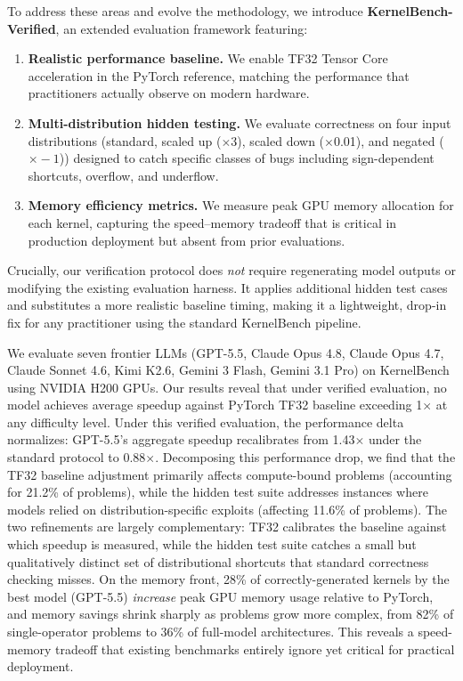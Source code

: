 \documentclass[]{fairmeta}
\begin{document}
To address these areas and evolve the methodology, we introduce \textbf{KernelBench-Verified}, an extended evaluation framework featuring:
\begin{enumerate}[nosep]
\item \textbf{Realistic performance baseline.} We enable TF32 Tensor Core acceleration in the PyTorch reference, matching the performance that practitioners actually observe on modern hardware.
\item \textbf{Multi-distribution hidden testing.} We evaluate correctness on four input distributions (standard, scaled up ($\times$3), scaled down ($\times$0.01), and negated ($\times{-}1$)) designed to catch specific classes of bugs including sign-dependent shortcuts, overflow, and underflow.
\item \textbf{Memory efficiency metrics.} We measure peak GPU memory allocation for each kernel, capturing the speed--memory tradeoff that is critical in production deployment but absent from prior evaluations.
\end{enumerate}

Crucially, our verification protocol does \emph{not} require regenerating model outputs or modifying the existing evaluation harness. It applies additional hidden test cases and substitutes a more realistic baseline timing, making it a lightweight, drop-in fix for any practitioner using the standard KernelBench pipeline.

We evaluate seven frontier LLMs (GPT-5.5, Claude Opus 4.8, Claude Opus 4.7, Claude Sonnet 4.6, Kimi K2.6, Gemini 3 Flash, Gemini 3.1 Pro) on KernelBench using NVIDIA H200 GPUs. Our results reveal that under verified evaluation, no model achieves average speedup against PyTorch TF32 baseline exceeding 1$\times$ at any difficulty level. Under this verified evaluation, the performance delta normalizes: GPT-5.5's aggregate speedup recalibrates from 1.43$\times$ under the standard protocol to 0.88$\times$. Decomposing this performance drop, we find that the TF32 baseline adjustment primarily affects compute-bound problems (accounting for 21.2\% of problems), while the hidden test suite addresses instances where models relied on distribution-specific exploits (affecting 11.6\% of problems). The two refinements are largely complementary: TF32 calibrates the baseline against which speedup is measured, while the hidden test suite catches a small but qualitatively distinct set of distributional shortcuts that standard correctness checking misses.
On the memory front, 28\% of correctly-generated kernels by the best model (GPT-5.5) \emph{increase} peak GPU memory usage relative to PyTorch, and memory savings shrink sharply as problems grow more complex, from 82\% of single-operator problems to 36\% of full-model architectures. This reveals a speed-memory tradeoff that existing benchmarks entirely ignore yet critical for practical deployment.
\end{document}
